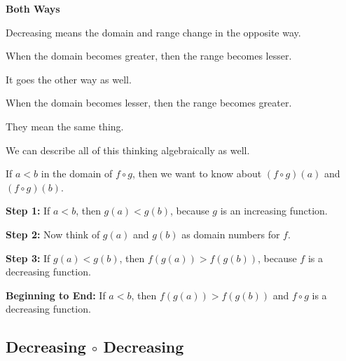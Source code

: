 \documentclass{ximera}
\begin{document}
\begin{warning} \textbf{\textcolor{red!70!black}{Both Ways}}

Decreasing means the domain and range change in the opposite way.

When the domain becomes greater, then the range becomes lesser.

It goes the other way as well.

When the domain becomes lesser, then the range becomes greater.

They mean the same thing.


\end{warning}






We can describe all of this thinking algebraically as well. 


If $a < b$ in the domain of $f \circ g$, then we want to know about $(f \circ g)(a)$  and $(f \circ g)(b)$.



\textbf{Step 1:}  If $a < b$, then $g(a) < g(b)$, because $g$ is an increasing function.


\textbf{Step 2:}  Now think of $g(a)$ and $g(b)$ as domain numbers for $f$.


\textbf{Step 3:}  If $g(a) < g(b)$, then $f(g(a)) > f(g(b))$, because $f$ is a decreasing function.


\textbf{Beginning to End:} If $a < b$, then $f(g(a)) > f(g(b))$ and $f \circ g$ is a decreasing function.














































\subsection*{Decreasing $\circ$ Decreasing}
\end{document}
